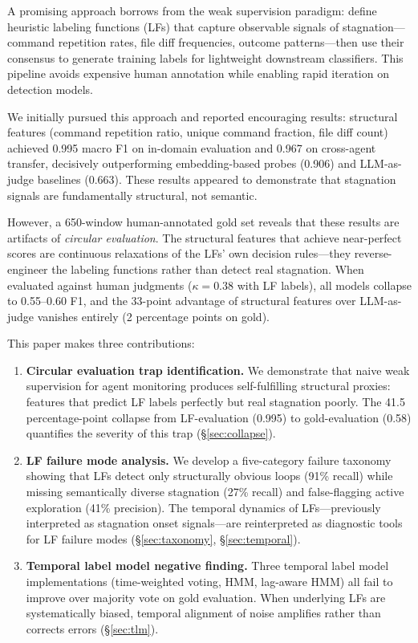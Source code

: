 \documentclass[11pt]{article}
\begin{document}
A promising approach borrows from the weak supervision paradigm: define heuristic labeling functions (LFs) that capture observable signals of stagnation---command repetition rates, file diff frequencies, outcome patterns---then use their consensus to generate training labels for lightweight downstream classifiers. This pipeline avoids expensive human annotation while enabling rapid iteration on detection models.

We initially pursued this approach and reported encouraging results: structural features (command repetition ratio, unique command fraction, file diff count) achieved 0.995 macro F1 on in-domain evaluation and 0.967 on cross-agent transfer, decisively outperforming embedding-based probes (0.906) and LLM-as-judge baselines (0.663). These results appeared to demonstrate that stagnation signals are fundamentally structural, not semantic.

However, a 650-window human-annotated gold set reveals that these results are artifacts of \emph{circular evaluation}. The structural features that achieve near-perfect scores are continuous relaxations of the LFs' own decision rules---they reverse-engineer the labeling functions rather than detect real stagnation. When evaluated against human judgments ($\kappa{=}0.38$ with LF labels), all models collapse to 0.55--0.60 F1, and the 33-point advantage of structural features over LLM-as-judge vanishes entirely (2 percentage points on gold).

This paper makes three contributions:

\begin{enumerate}
\item \textbf{Circular evaluation trap identification.} We demonstrate that naive weak supervision for agent monitoring produces self-fulfilling structural proxies: features that predict LF labels perfectly but real stagnation poorly. The 41.5 percentage-point collapse from LF-evaluation (0.995) to gold-evaluation (0.58) quantifies the severity of this trap (\S\ref{sec:collapse}).

\item \textbf{LF failure mode analysis.} We develop a five-category failure taxonomy showing that LFs detect only structurally obvious loops (91\% recall) while missing semantically diverse stagnation (27\% recall) and false-flagging active exploration (41\% precision). The temporal dynamics of LFs---previously interpreted as stagnation onset signals---are reinterpreted as diagnostic tools for LF failure modes (\S\ref{sec:taxonomy}, \S\ref{sec:temporal}).

\item \textbf{Temporal label model negative finding.} Three temporal label model implementations (time-weighted voting, HMM, lag-aware HMM) all fail to improve over majority vote on gold evaluation. When underlying LFs are systematically biased, temporal alignment of noise amplifies rather than corrects errors (\S\ref{sec:tlm}).
\end{enumerate}
\end{document}
